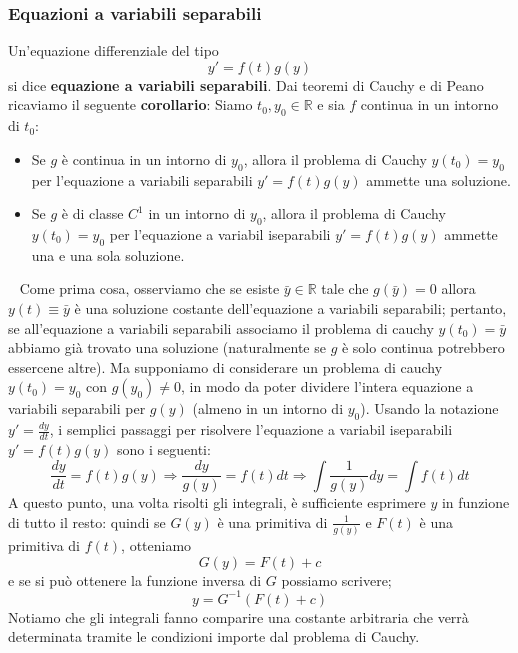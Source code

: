 \subsubsection{Equazioni a variabili separabili}
Un'equazione differenziale del tipo
\[
    y' = f(t)g(y)
\]
si dice \textbf{equazione a variabili separabili}.\newline
\newline
Dai teoremi di Cauchy e di Peano ricaviamo il seguente \textbf{corollario}:\newline
Siamo $t_0,y_0 \in \mathbb{R}$ e sia $f$ continua in un intorno di $t_0$:
\begin{itemize}
    \item Se $g$ è continua in un intorno di $y_0$, allora il problema di Cauchy $y(t_0) = y_0$ per l'equazione a variabili separabili $y'=f(t)g(y)$ ammette una soluzione.
    \item Se $g$ è di classe $C^1$ in un intorno di $y_0$, allora il problema di Cauchy $y(t_0) = y_0$ per l'equazione a variabil iseparabili $y'=f(t) g(y)$ ammette una e una sola soluzione.
\end{itemize}
\ \newline
Come prima cosa, osserviamo che se esiste $\bar{y} \in \mathbb{R}$ tale che $g(\bar{y}) = 0$ allora $y(t) \equiv \bar{y}$ è una soluzione costante dell'equazione a variabili separabili; pertanto, se all'equazione a variabili separabili associamo il problema di cauchy $y(t_0) = \bar{y}$ abbiamo già trovato una soluzione (naturalmente se $g$ è solo continua potrebbero essercene altre). Ma supponiamo di considerare un problema di cauchy $y(t_0) = y_0$ con $g(y_0) \neq 0$, in modo da poter dividere l'intera equazione a variabili separabili per $g(y)$ (almeno in un intorno di $y_0$). Usando la notazione $y' = \frac{dy}{dt}$, i semplici passaggi per risolvere l'equazione a variabil iseparabili $y' = f(t) g(y)$ sono i seguenti:
\[
    \frac{dy}{dt} = f(t) g(y) \Longrightarrow \frac{dy}{g(y)} = f(t) dt \Longrightarrow \int \frac{1}{g(y)}dy = \int f(t) dt
\]
A questo punto, una volta risolti gli integrali, è sufficiente esprimere $y$ in funzione di tutto il resto: quindi se $G(y)$ è una primitiva di $\frac{1}{g(y)}$ e $F(t)$ è una primitiva di $f(t)$, otteniamo
\[
    G(y) = F(t) + c
\]
e se si può ottenere la funzione inversa di $G$ possiamo scrivere;
\[
    y = G^{-1}(F(t) + c)
\]
Notiamo che gli integrali fanno comparire una costante arbitraria che verrà determinata tramite le condizioni importe dal problema di Cauchy.
\newline
